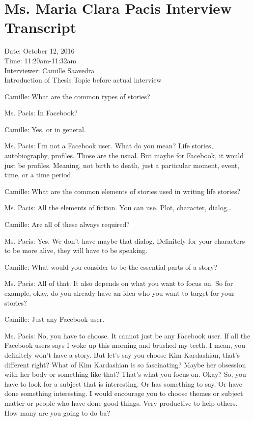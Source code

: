 %
%
%                 

\chapter{Ms. Maria Clara Pacis Interview Transcript}
\label{sec:appendixc}

Date: October 12, 2016 \\
Time: 11:20am-11:32am \\
Interviewer: Camille Saavedra \\
 
Introduction of Thesis Topic before actual interview
 
Camille: What are the common types of stories?
 
Ms. Pacis: In Facebook?
 
Camille: Yes, or in general.
 
Ms. Pacis: I’m not a Facebook user. What do you mean? Life stories, autobiography, profiles. Those are the usual. But maybe for Facebook, it would just be profiles. Meaning, not birth to death, just a particular moment, event, time, or a time period.
 
Camille: What are the common elements of stories used in writing life stories?
 
Ms. Pacis: All the elements of fiction. You can use. Plot, character, dialog…
 
Camille: Are all of these always required?
 
Ms. Pacis: Yes. We don't have maybe that dialog. Definitely for your characters to be more alive, they will have to be speaking.
 
Camille: What would you consider to be the essential parts of a story?
 
Ms. Pacis: All of that. It also depends on what you want to focus on. So for example, okay, do you already have an idea who you want to target for your stories?
 
Camille: Just any Facebook user.
 
Ms. Pacis: No, you have to choose. It cannot just be any Facebook user. If all the Facebook users says I woke up this morning and brushed my teeth. I mean, you definitely won’t have a story. But let's say you choose Kim Kardashian, that's different right? What of Kim Kardashian is so fascinating? Maybe her obsession with her body or something like that? That's what you focus on. Okay? So, you have to look for a subject that is interesting. Or has something to say. Or have done something interesting. I would encourage you to choose themes or subject matter or people who have done good things. Very productive to help others. How many are you going to do ba?
 
